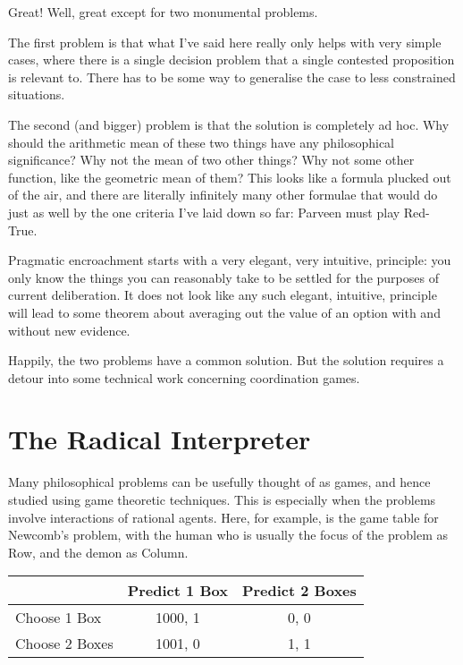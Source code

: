 \documentclass[
  11pt,
]{book}
\begin{document}
Great! Well, great except for two monumental problems.

The first problem is that what I've said here really only helps with very simple cases, where there is a single decision problem that a single contested proposition is relevant to. There has to be some way to generalise the case to less constrained situations.

The second (and bigger) problem is that the solution is completely ad hoc. Why should the arithmetic mean of these two things have any philosophical significance? Why not the mean of two other things? Why not some other function, like the geometric mean of them? This looks like a formula plucked out of the air, and there are literally infinitely many other formulae that would do just as well by the one criteria I've laid down so far: Parveen must play Red-True.

Pragmatic encroachment starts with a very elegant, very intuitive, principle: you only know the things you can reasonably take to be settled for the purposes of current deliberation. It does not look like any such elegant, intuitive, principle will lead to some theorem about averaging out the value of an option with and without new evidence.

Happily, the two problems have a common solution. But the solution requires a detour into some technical work concerning coordination games.

\hypertarget{radicalinterpretation}{%
\section{The Radical Interpreter}\label{radicalinterpretation}}

Many philosophical problems can be usefully thought of as games, and hence studied using game theoretic techniques. This is especially when the problems involve interactions of rational agents. Here, for example, is the game table for Newcomb's problem, with the human who is usually the focus of the problem as Row, and the demon as Column.

\begin{longtable}[]{@{}lcc@{}}
\toprule\noalign{}
& Predict 1 Box & Predict 2 Boxes \\
\midrule\noalign{}
\endhead
\bottomrule\noalign{}
\endlastfoot
Choose 1 Box & 1000, 1 & 0, 0 \\
Choose 2 Boxes & 1001, 0 & 1, 1 \\
\end{longtable}
\end{document}
